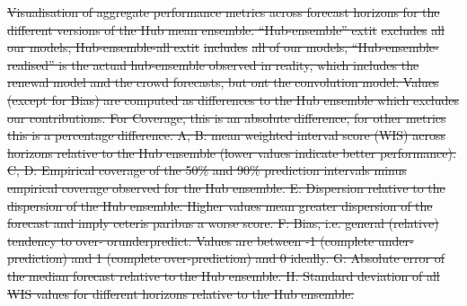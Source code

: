 \documentclass[10pt,letterpaper]{article}
\providecommand{\DIFdeltex}[1]{{\protect\color{red}\sout{#1}}}                      %
\providecommand{\DIFdelFL}[1]{\DIFdel{#1}} %
\providecommand{\DIFdel}[1]{\texorpdfstring{\DIFdeltex{#1}}{}} %
\begin{document}



{%
\DIFdelFL{Visualisation of aggregate performance metrics across forecast horizons for the different versions of the Hub mean ensemble. “Hub-ensemble”     extit}%
\DIFdelFL{excludes}%
\DIFdelFL{all our models, Hub-ensemble-all    extit}%
\DIFdelFL{includes}%
\DIFdelFL{all of our models, “Hub-ensemble-realised” is the actual hub-ensemble observed in reality, which includes the renewal model and the crowd forecasts, but ont the convolution model. Values (except for Bias) are computed as differences to the Hub ensemble which excludes our contributions. For Coverage, this is an absolute difference, for other metrics this is a percentage difference. A, B: mean weighted interval score (WIS) across horizons relative to the Hub ensemble (lower values indicate better performance). C, D: Empirical coverage of the 50\% and 90\% prediction intervals minus empirical coverage observed for the Hub ensemble. E: Dispersion relative to the dispersion of the Hub ensemble. Higher values mean greater dispersion of the forecast and imply ceteris paribus a worse score. F: Bias, i.e. general (relative) tendency to over- orunderpredict. Values are between -1 (complete under-prediction) and 1 (complete over-prediction) and 0 ideally. G: Absolute error of the median forecast relative to the Hub ensemble. H. Standard deviation of all WIS values for different horizons relative to the Hub ensemble.}}%
\end{document}
